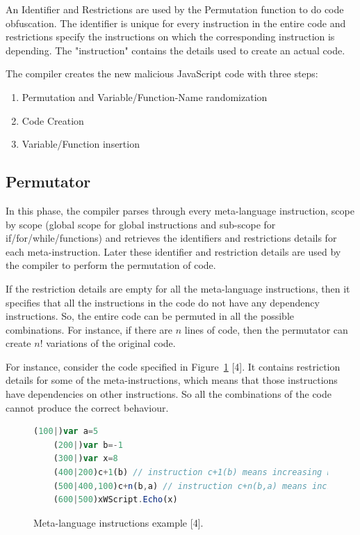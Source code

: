 An Identifier and Restrictions are used by the Permutation function to do code obfuscation. The identifier is unique for every instruction in the entire code and restrictions specify the instructions on which the corresponding instruction is depending. The "instruction" contains the details used to create an actual code. 

The compiler creates the new malicious JavaScript code with three steps:

\begin{enumerate}
  \item Permutation and Variable/Function-Name randomization
  \item Code Creation
  \item Variable/Function insertion
\end{enumerate}

\subsection{Permutator}

In this phase, the compiler parses through every meta-language instruction, scope by scope (global scope for global instructions and sub-scope for if/for/while/functions) and retrieves the identifiers and restrictions details for each meta-instruction. Later these identifier and restriction details are used by the compiler to perform the permutation of code.

If the restriction details are empty for all the meta-language instructions, then it specifies that all the instructions in the code do not have any dependency instructions. So, the entire code can be permuted in all the possible combinations. For instance, if there are $n$ lines of code, then the permutator can create $n!$ variations of the original code. 

For instance, consider the code specified in Figure~\ref{fig:permutator} [4]. It contains restriction details for some of the meta-instructions, which means that those instructions have dependencies on other instructions. So all the combinations of the code cannot produce the correct behaviour. 


\begin{figure}
  \centering
  \begin{lstlisting}[language=JavaScript]
	(100|)var a=5
	(200|)var b=-1
	(300|)var x=8
	(400|200)c+1(b)	// instruction c+1(b) means increasing b by 1: i.e. b++
	(500|400,100)c+n(b,a) // instruction c+n(b,a) means increasing b by a: i.e. b+=a
	(600|500)xWScript.Echo(x)
\end{lstlisting}


    \caption[Meta-language instructions example]{Meta-language instructions example [4].}
    \label{fig:permutator}
\end{figure}


